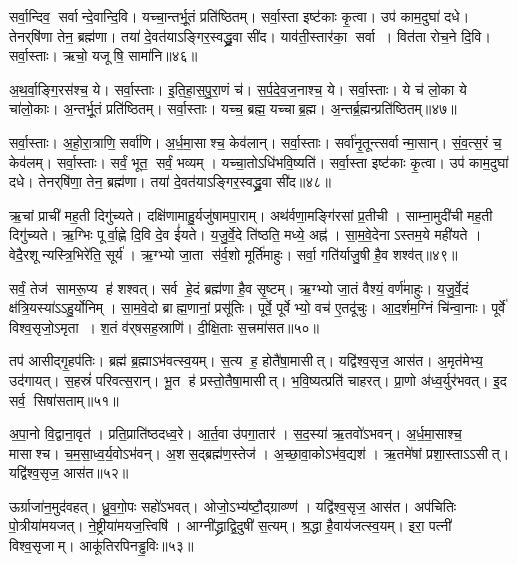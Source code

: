    सर्वा॒न्दिव॒ सर्वान्दे॒वान्दि॒वि।
   यच्चा॒न्तर्भू॒तं प्रति॑ष्ठितम्।
   सर्वा॒स्ता इष्ट॑काः कृ॒त्वा।
   उप॑ काम॒दुघा॑ दधे।
   तेनर्‌षि॑णा तेन॒ ब्रह्म॑णा।
   तया॑ दे॒वत॑याऽङ्गिर॒स्वद्ध्रु॒वा सी॑द।
   याव॑ती॒स्तार॑का॒ सर्वा।
   वित॑ता रोच॒ने दि॒वि।
   सर्वा॒स्ताः।
   ऋचो॒ यजूषि॒ सामा॑नि॥४६॥

   अ॒थ॒र्वा॒ङ्गि॒रस॑श्च॒ ये।
   सर्वा॒स्ताः।
   इ॒ति॒हा॒स॒पु॒रा॒णं च॑।
   स॒र्प॒दे॒व॒ज॒नाश्च॒ ये।
   सर्वा॒स्ताः।
   ये च॑ लो॒का ये चा॑लो॒काः।
   अ॒न्तर्भू॒तं प्रति॑ष्ठितम्।
   सर्वा॒स्ताः।
   यच्च॒ ब्रह्म॒ यच्चाब्र॒ह्म।
   अ॒न्तर्ब्र॒ह्मन्प्रति॑ष्ठितम्॥४७॥

   सर्वा॒स्ताः।
   अ॒हो॒रा॒त्राणि॒ सर्वा॑णि।
   अ॒र्ध॒मा॒साश्च॒ केव॑लान्।
   सर्वा॒स्ताः।
   सर्वा॑नृ॒तून्त्सर्वान्मा॒सान्।
   सं॒व॒त्स॒रं च॒ केव॑लम्।
   सर्वा॒स्ताः।
   सर्वं॒ भूत॒ सर्वं॒ भव्यम्।
   यच्चा॒तोऽधि॑भवि॒ष्यति॑।
   सर्वा॒स्ता इष्ट॑काः कृ॒त्वा।
   उप॑ काम॒दुघा॑ दधे।
   तेनर्‌षि॑णा॒ तेन॒ ब्रह्म॑णा।
   तया॑ दे॒वत॑याऽङ्गिर॒स्वद्ध्रु॒वा सी॑द॥४८॥
\anuvakamend
  
   ऋ॒चां प्राची॑ मह॒ती दिगु॑च्यते।
   दक्षि॑णामाहु॒र्यजु॑षामपा॒राम्।
   अथ॑र्वणा॒मङ्गि॑रसां प्र॒तीची।
   साम्ना॒मुदी॑ची मह॒ती दिगु॑च्यते।
   ऋ॒ग्भिः पूर्वा॒ह्णे दि॒वि दे॒व ई॑यते।
   य॒जु॒र्वे॒दे ति॑ष्ठति॒ मध्ये॒ अह्न॑।
   सा॒म॒वे॒देनाऽस्तम॒ये मही॑यते ।
   वेदै॒रशून्यस्त्रि॒भिरे॑ति॒ सूर्य॑।
   ऋ॒ग्भ्यो जा॒ता स॑र्व॒शो मूर्ति॑माहुः।
   सर्वा॒ गति॑र्याजु॒षी है॒व शश्व॑त्॥४९॥

   सर्वं॒ तेज॑ सामरू॒प्य ह॑ शश्वत्।
   सर्व हे॒दं ब्रह्म॑णा है॒व सृ॒ष्टम्।
   ऋ॒ग्भ्यो जा॒तं वैश्यं॒ वर्ण॑माहुः।
   य॒जु॒र्वे॒दं क्ष॑त्रि॒यस्या॑ऽऽहु॒र्योनिम्।
   सा॒म॒वे॒दो ब्राह्म॒णानां॒ प्रसू॑तिः।
   पूर्वे॒ पूर्वेभ्यो॒ वच॑ ए॒तदू॑चुः।
   आ॒द॒र्\mbox{}शम॒ग्निं चि॑न्वा॒नाः।
   पूर्वे॑ विश्व॒सृजो॒ऽमृता।
   श॒तं व॑र्‌षसह॒स्राणि॑।
   दी॒क्षि॒ताः स॒त्त्रमा॑सत॥५०॥

   तप॑ आसीद्गृ॒हप॑तिः।
   ब्रह्म॑ ब्र॒ह्माऽभ॑वत्स्व॒यम्।
   स॒त्य ह॒ होतै॑षा॒मासीत्।
   यद्वि॑श्व॒सृज॒ आस॑त।
   अ॒मृत॑मेभ्य॒ उद॑गायत्।
   स॒हस्रं॑ परिवत्स॒रान्।
   भू॒त ह॑ प्रस्तो॒तैषा॒मासीत्।
   भ॒वि॒ष्यत्प्रति॑ चाहरत्।
   प्रा॒णो अ॑ध्व॒र्युर॑भवत्।
   इ॒द सर्व॒ सिषा॑सताम्॥५१॥

   अ॒पा॒नो वि॒द्वाना॒वृत॑।
   प्रति॒प्राति॑ष्ठदध्व॒रे।
   आ॒र्त॒वा उ॑पगा॒तार॑।
   स॒द॒स्या॑ ऋ॒तवो॑ऽभवन्।
   अ॒र्ध॒मा॒साश्च॒ मासाश्च।
   च॒म॒सा॒ध्व॒र्य॒वोऽभ॑वन्।
   अ॒शस॒द्ब्रह्म॑ण॒स्तेज॑।
   अ॒च्छा॒वा॒कोऽभ॑व॒द्यश॑।
   ऋ॒तमे॑षां प्रशा॒स्ताऽऽसीत्।
   यद्वि॑श्व॒सृज॒ आस॑त॥५२॥

   ऊर्ग्राजा॑न॒मुद॑वहत्।
   ध्रु॒व॒गो॒पः सहो॑ऽभवत्।
   ओजो॒ऽभ्य॑ष्टौ॒\-द्ग्राव्ण्ण॑।
   यद्वि॑श्व॒सृज॒ आस॑त।
   अप॑चितिः पो॒त्रीया॑मयजत्।
   ने॒ष्ट्रीया॑म\-यज॒त्त्विषि॑।
   आग्नी॑द्ध्राद्वि॒दुषी॑ स॒त्यम्।
   श्र॒द्धा है॒वाय॑जत्स्व॒यम्।
   इरा॒ पत्नी॑ विश्व॒सृजाम्।
   आकू॑तिरपिन\-ड्ढ॒विः॥५३॥

